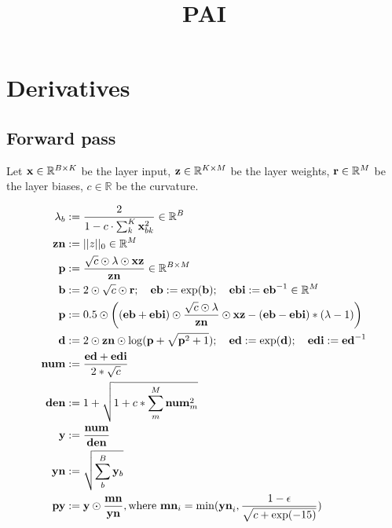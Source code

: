 \documentclass{article}
\title{PAI}
\begin{document}
\maketitle

\section{Derivatives}

\subsection{Forward pass}

\newcommand{\ddfrac}[2]{\frac{\partial #1}{\partial #2}}
\newcommand{\colnorm}[1]{\|#1\|_{1,\text{col}}}
\newcommand{\rownorm}[1]{\|#1\|_{1,\text{row}}}

Let $\v{x} \in \mathbb{R}^{B\times K}$ be the layer input, $\v{z} \in \mathbb{R}^{K\times M}$ be the layer weights, $\v{r} \in \mathbb{R}^{M}$ be the layer biases, $c \in \mathbb{R}$ be the curvature.

\begin{align*}
    \lambda_b &:= \frac{2}{1 - c \cdot \sum_{k}^K\v{x}{bk}^2} \in \mathbb{R}^{B} \\
    \v{zn} &:= ||z||_0 \in \mathbb{R}^{M} \\
    \v{p} &:= \frac{\sqrt{c} \odot \lambda \odot \v{x} \v{z}}{\v{zn}} \in \mathbb{R}^{B\times M} \\
    \v{b} &:= 2 \odot \sqrt{c} \odot \v{r}; \quad \v{eb} := \exp(\v{b}); \quad \v{ebi} := \v{eb}^{-1} \in \mathbb{R}^{M} \\
    \v{p} &:= 0.5 \odot \left((\v{eb} + \v{ebi}) \odot \frac{\sqrt{c} \odot \lambda}{\v{zn}} \odot \v{x} \v{z} - (\v{eb} - \v{ebi}) * (\lambda - 1)\right) \\
    \v{d} &:= 2 \odot \v{zn} \odot \log(\v{p} + \sqrt{\v{p}^2 + 1}); \quad \v{ed} := \exp(\v{d}); \quad \v{edi} := \v{ed}^{-1}\\
    \v{num} &:= \frac{\v{ed} + \v{edi}}{2 * \sqrt{c}} \\
    \v{den} &:= 1 + \sqrt{1 + c * \sum_{m}^M \v{num}{m}^2} \\
    \v{y} &:= \frac{\v{num}}{\v{den}} \\
    \v{yn} &:= \sqrt{\sum_b^B \v{y}{b}} \\
    \v{py} &:= \v{y} \odot \frac{\v{mn}}{\v{yn}}, \text{where } \v{mn}{i} = \min(\v{yn}{i}, \frac{1 - \epsilon}{\sqrt{c + \exp(-15)}}) \\
\end{align*}
\end{document}
